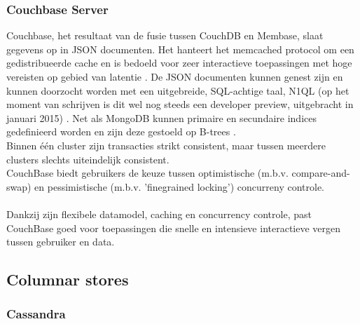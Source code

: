\subsubsection{Couchbase Server}

Couchbase, het resultaat van de fusie tussen CouchDB en Membase, slaat gegevens op in JSON documenten. Het hanteert het memcached protocol om een gedistribueerde cache en is bedoeld voor zeer interactieve toepassingen met hoge vereisten op gebied van latentie \cite{grolinger2013data}\cite{couchbase_about}.
De JSON documenten kunnen genest zijn en kunnen doorzocht worden met een uitgebreide, SQL-achtige taal, N1QL (op het moment van schrijven is dit wel nog steeds een developer preview, uitgebracht in januari 2015) \cite{couchbase_n1ql}.
Net als MongoDB kunnen primaire en secundaire indices gedefinieerd worden en zijn deze gestoeld op B-trees \cite{couchbase_index}.\\
Binnen \'e\'en cluster zijn transacties strikt consistent, maar tussen meerdere clusters slechts uiteindelijk consistent.\\
CouchBase biedt gebruikers de keuze tussen optimistische (m.b.v. compare-and-swap) en pessimistische (m.b.v. 'finegrained locking') concurreny controle.\\\\
Dankzij zijn flexibele datamodel, caching en concurrency controle, past CouchBase goed voor toepassingen die snelle en intensieve interactieve vergen tussen gebruiker en data.

\subsection{Columnar stores}

\subsubsection{Cassandra}

